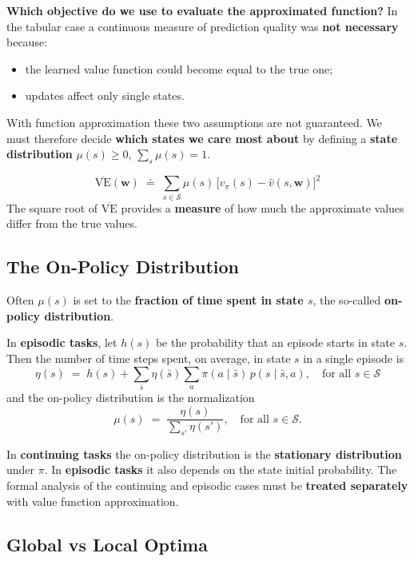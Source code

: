 \documentclass[11pt,a4paper]{article}
\theoremstyle{definition}
\theoremstyle{plain}
\theoremstyle{remark}
\begin{document}
\textbf{Which objective do we use to evaluate the approximated function?} In the tabular case a continuous measure of prediction quality was \textbf{not necessary} because:
\begin{itemize}
    \item the learned value function could become equal to the true one;
    \item updates affect only single states.
\end{itemize}

With function approximation these two assumptions are not guaranteed. We must therefore decide \textbf{which states we care most about} by defining a \textbf{state distribution} $\mu(s) \geq 0$, $\sum_s \mu(s) = 1$.

\begin{tcolorbox}[colback=red!5!white, colframe=red!70!black, title={Mean Squared Value Error}]
\[
    \overline{\mathrm{VE}}(\mathbf{w}) \;\doteq\; \sum_{s \in \mathcal{S}} \mu(s)\, \bigl[v_\pi(s) - \hat{v}(s, \mathbf{w})\bigr]^2
\]
The square root of $\overline{\mathrm{VE}}$ provides a \textbf{measure} of how much the approximate values differ from the true values.
\end{tcolorbox}

\subsection{The On-Policy Distribution}

Often $\mu(s)$ is set to the \textbf{fraction of time spent in state $s$}, the so-called \textbf{on-policy distribution}.

In \textbf{episodic tasks}, let $h(s)$ be the probability that an episode starts in state $s$. Then the number of time steps spent, on average, in state $s$ in a single episode is
\[
    \eta(s) \;=\; h(s) + \sum_{\bar{s}} \eta(\bar{s}) \sum_{a} \pi(a \mid \bar{s})\, p(s \mid \bar{s}, a), \quad \text{for all } s \in \mathcal{S}
\]
and the on-policy distribution is the normalization
\[
    \mu(s) \;=\; \frac{\eta(s)}{\sum_{s'} \eta(s')}, \quad \text{for all } s \in \mathcal{S}.
\]

In \textbf{continuing tasks} the on-policy distribution is the \textbf{stationary distribution} under $\pi$. In \textbf{episodic tasks} it also depends on the state initial probability. The formal analysis of the continuing and episodic cases must be \textbf{treated separately} with value function approximation.

\subsection{Global vs Local Optima}
\end{document}
